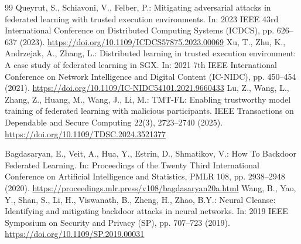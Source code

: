 \documentclass[10pt,a4paper,UTF8,fontset=fandol]{ctexart}
\begin{document}
\begin{thebibliography}{99}
     Queyrut, S., Schiavoni, V., Felber, P.: Mitigating adversarial attacks in federated learning with trusted execution environments. In: 2023 IEEE 43rd International Conference on Distributed Computing Systems (ICDCS), pp. 626--637 (2023). \url{https://doi.org/10.1109/ICDCS57875.2023.00069}
     Xu, T., Zhu, K., Andrzejak, A., Zhang, L.: Distributed learning in trusted execution environment: A case study of federated learning in SGX. In: 2021 7th IEEE International Conference on Network Intelligence and Digital Content (IC-NIDC), pp. 450--454 (2021). \url{https://doi.org/10.1109/IC-NIDC54101.2021.9660433}
     Lu, Z., Wang, L., Zhang, Z., Huang, M., Wang, J., Li, M.: TMT-FL: Enabling trustworthy model training of federated learning with malicious participants. IEEE Transactions on Dependable and Secure Computing 22(3), 2723--2740 (2025). \url{https://doi.org/10.1109/TDSC.2024.3521377}

     Bagdasaryan, E., Veit, A., Hua, Y., Estrin, D., Shmatikov, V.: How To Backdoor Federated Learning. In: Proceedings of the Twenty Third International Conference on Artificial Intelligence and Statistics, PMLR 108, pp. 2938--2948 (2020). \url{https://proceedings.mlr.press/v108/bagdasaryan20a.html}
     Wang, B., Yao, Y., Shan, S., Li, H., Viswanath, B., Zheng, H., Zhao, B.Y.: Neural Cleanse: Identifying and mitigating backdoor attacks in neural networks. In: 2019 IEEE Symposium on Security and Privacy (SP), pp. 707--723 (2019). \url{https://doi.org/10.1109/SP.2019.00031}

\end{thebibliography}
\endgroup
\end{document}
